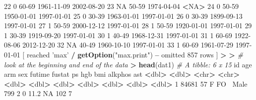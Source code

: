 \documentclass[
]{book}
\newenvironment{Shaded}{\begin{snugshade}}{\end{snugshade}}
\newcommand{\CommentTok}[1]{\textcolor[rgb]{0.56,0.35,0.01}{\textit{#1}}}
\newcommand{\DecValTok}[1]{\textcolor[rgb]{0.00,0.00,0.81}{#1}}
\newcommand{\ErrorTok}[1]{\textcolor[rgb]{0.64,0.00,0.00}{\textbf{#1}}}
\newcommand{\FloatTok}[1]{\textcolor[rgb]{0.00,0.00,0.81}{#1}}
\newcommand{\KeywordTok}[1]{\textcolor[rgb]{0.13,0.29,0.53}{\textbf{#1}}}
\newcommand{\NormalTok}[1]{#1}
\newcommand{\OperatorTok}[1]{\textcolor[rgb]{0.81,0.36,0.00}{\textbf{#1}}}
\newcommand{\OtherTok}[1]{\textcolor[rgb]{0.56,0.35,0.01}{#1}}
\newcommand{\StringTok}[1]{\textcolor[rgb]{0.31,0.60,0.02}{#1}}
\begin{document}
\begin{Shaded}
\begin{Highlighting}[]
\DecValTok{22}          \DecValTok{0}  \DecValTok{60-69} \DecValTok{1961-11-09} \DecValTok{2002-08-20}
\DecValTok{23}         \OtherTok{NA}  \DecValTok{50-59} \DecValTok{1974-04-04}       \OperatorTok{<}\OtherTok{NA}\OperatorTok{>}
\DecValTok{24}          \DecValTok{0}  \DecValTok{50-59} \DecValTok{1950-01-01} \DecValTok{1997-01-01}
\DecValTok{25}          \DecValTok{0}  \DecValTok{30-39} \DecValTok{1963-01-01} \DecValTok{1997-01-01}
\DecValTok{26}          \DecValTok{0}  \DecValTok{30-39} \DecValTok{1899-09-13} \DecValTok{1997-01-01}
\DecValTok{27}          \DecValTok{1}  \DecValTok{50-59} \DecValTok{2000-12-12} \DecValTok{1997-01-01}
\DecValTok{28}          \DecValTok{1}  \DecValTok{50-59} \DecValTok{1920-01-01} \DecValTok{1997-01-01}
\DecValTok{29}          \DecValTok{1}  \DecValTok{30-39} \DecValTok{1919-09-20} \DecValTok{1997-01-01}
\DecValTok{30}          \DecValTok{1}  \DecValTok{40-49} \DecValTok{1968-12-31} \DecValTok{1997-01-01}
\DecValTok{31}          \DecValTok{1}  \DecValTok{60-69} \DecValTok{1922-08-06} \DecValTok{2012-12-20}
\DecValTok{32}         \OtherTok{NA}  \DecValTok{40-49} \DecValTok{1960-10-10} \DecValTok{1997-01-01}
\DecValTok{33}          \DecValTok{1}  \DecValTok{60-69} \DecValTok{1961-07-29} \DecValTok{1997-01-01}
\NormalTok{ [ reached }\StringTok{'max'} \OperatorTok{/}\StringTok{ }\KeywordTok{getOption}\NormalTok{(}\StringTok{"max.print"}\NormalTok{) }\OperatorTok{--}\StringTok{ }\NormalTok{omitted }\DecValTok{857}\NormalTok{ rows ]}
\OperatorTok{>}\StringTok{ }
\ErrorTok{>}\StringTok{ }\CommentTok{# look at the beginning and end of the data}
\ErrorTok{>}\StringTok{ }\KeywordTok{head}\NormalTok{(dat1)}
\CommentTok{# A tibble: 6 x 15}
\NormalTok{     id   age arm   sex   futime fustat    ps   hgb   bmi alkphos   ast}
  \OperatorTok{<}\NormalTok{dbl}\OperatorTok{>}\StringTok{ }\ErrorTok{<}\NormalTok{dbl}\OperatorTok{>}\StringTok{ }\ErrorTok{<}\NormalTok{chr}\OperatorTok{>}\StringTok{ }\ErrorTok{<}\NormalTok{chr}\OperatorTok{>}\StringTok{  }\ErrorTok{<}\NormalTok{dbl}\OperatorTok{>}\StringTok{  }\ErrorTok{<}\NormalTok{dbl}\OperatorTok{>}\StringTok{ }\ErrorTok{<}\NormalTok{dbl}\OperatorTok{>}\StringTok{ }\ErrorTok{<}\NormalTok{dbl}\OperatorTok{>}\StringTok{ }\ErrorTok{<}\NormalTok{dbl}\OperatorTok{>}\StringTok{   }\ErrorTok{<}\NormalTok{dbl}\OperatorTok{>}\StringTok{ }\ErrorTok{<}\NormalTok{dbl}\OperatorTok{>}
\DecValTok{1} \DecValTok{84681}    \DecValTok{57}\NormalTok{ F FO}\OperatorTok{~}\StringTok{ }\NormalTok{Male     }\DecValTok{799}      \DecValTok{2}     \DecValTok{0}  \FloatTok{11.2}    \OtherTok{NA}     \DecValTok{102}     \DecValTok{7}

\end{Highlighting}
\end{Shaded}
\end{document}
